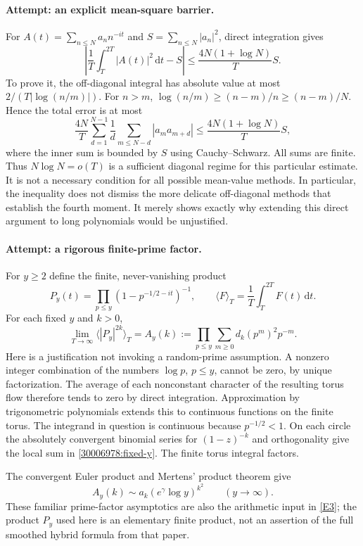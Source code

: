 \documentclass[11pt,a4paper]{article}
\newcommand{\dd}{\,\mathrm d}
\newcommand{\eref}[2]{\hyperlink{extra:#1:#2}{[E#2]}}
\numberwithin{equation}{section}
\begin{document}
\paragraph{Attempt: an explicit mean-square barrier.}
For $A(t)=\sum_{n\le N}a_n n^{-it}$ and
$S=\sum_{n\le N}|a_n|^2$, direct integration gives
\begin{equation}\label{30006978:mean-square}
 \left|\frac1T\int_T^{2T}|A(t)|^2\dd t-S\right|
 \le\frac{4N(1+\log N)}{T}S.
\end{equation}
To prove it, the off-diagonal integral has absolute value at most
$2/(T|\log(n/m)|)$. For $n>m$,
$\log(n/m)\ge(n-m)/n\ge(n-m)/N$. Hence the total error is at most
\[
 \frac{4N}{T}\sum_{d=1}^{N-1}\frac1d
       \sum_{m\le N-d}|a_ma_{m+d}|
 \le \frac{4N(1+\log N)}{T}S,
\]
where the inner sum is bounded by $S$ using Cauchy--Schwarz. All sums
are finite. Thus $N\log N=o(T)$ is a sufficient diagonal regime for this
particular estimate. It is not a necessary condition for all possible
mean-value methods. In particular, the inequality does not dismiss the
more delicate off-diagonal methods that establish the fourth moment.
It merely shows exactly why extending this direct argument to long
polynomials would be unjustified.

\paragraph{Attempt: a rigorous finite-prime factor.}
For $y\ge2$ define the finite, never-vanishing product
\[
 P_y(t)=\prod_{p\le y}(1-p^{-1/2-it})^{-1},\qquad
 \langle F\rangle_T=\frac1T\int_T^{2T}F(t)\dd t.
\]
For each fixed $y$ and $k>0$,
\begin{equation}\label{30006978:fixed-y}
 \lim_{T\to\infty}\langle|P_y|^{2k}\rangle_T
 =A_y(k):=\prod_{p\le y}\sum_{m\ge0}d_k(p^m)^2p^{-m}.
\end{equation}
Here is a justification not invoking a random-prime assumption. A nonzero
integer combination of the numbers $\log p$, $p\le y$, cannot be zero,
by unique factorization. The average of each nonconstant character of
the resulting torus flow therefore tends to zero by direct integration.
Approximation by trigonometric polynomials extends this to continuous
functions on the finite torus. The integrand in question is continuous
because $p^{-1/2}<1$. On each circle the absolutely convergent binomial
series for $(1-z)^{-k}$ and orthogonality give the local sum in
\eqref{30006978:fixed-y}. The finite torus integral factors.

The convergent Euler product and Mertens' product theorem give
\begin{equation}\label{30006978:Ay}
 A_y(k)\sim a_k(e^\gamma\log y)^{k^2}
 \qquad(y\to\infty).
\end{equation}
These familiar prime-factor asymptotics are also the arithmetic input in
\eref{30006978}{3}; the product $P_y$ used here is an elementary finite product,
not an assertion of the full smoothed hybrid formula from that paper.
\end{document}
